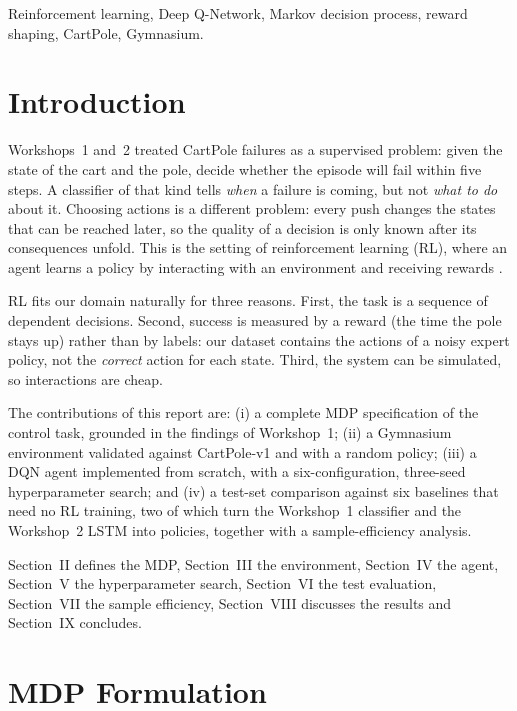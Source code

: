 \documentclass[conference]{IEEEtran}
\begin{document}
\begin{IEEEkeywords}
Reinforcement learning, Deep Q-Network, Markov decision process, reward shaping, CartPole, Gymnasium.
\end{IEEEkeywords}

\section{Introduction}
Workshops~1 and~2 treated CartPole failures as a supervised problem: given the state
of the cart and the pole, decide whether the episode will fail within five steps. A
classifier of that kind tells \emph{when} a failure is coming, but not \emph{what to do}
about it. Choosing actions is a different problem: every push changes the states that
can be reached later, so the quality of a decision is only known after its consequences
unfold. This is the setting of reinforcement learning (RL), where an agent learns a
policy by interacting with an environment and receiving rewards \cite{sutton2018}.

RL fits our domain naturally for three reasons. First, the task is a sequence of
dependent decisions. Second, success is measured by a reward (the time the pole stays
up) rather than by labels: our dataset contains the actions of a noisy expert policy,
not the \emph{correct} action for each state. Third, the system can be simulated, so
interactions are cheap.

The contributions of this report are: (i) a complete MDP specification of the
control task, grounded in the findings of Workshop~1; (ii) a Gymnasium environment
validated against CartPole-v1 and with a random policy; (iii) a DQN agent
\cite{mnih2015} implemented from scratch, with a six-configuration, three-seed
hyperparameter search; and (iv) a test-set comparison against six baselines that need
no RL training, two of which turn the Workshop~1 classifier and the Workshop~2 LSTM into
policies, together with a sample-efficiency analysis.

Section~II defines the MDP, Section~III the environment, Section~IV the agent,
Section~V the hyperparameter search, Section~VI the test evaluation, Section~VII the
sample efficiency, Section~VIII discusses the results and Section~IX concludes.

\section{MDP Formulation}
\end{document}
